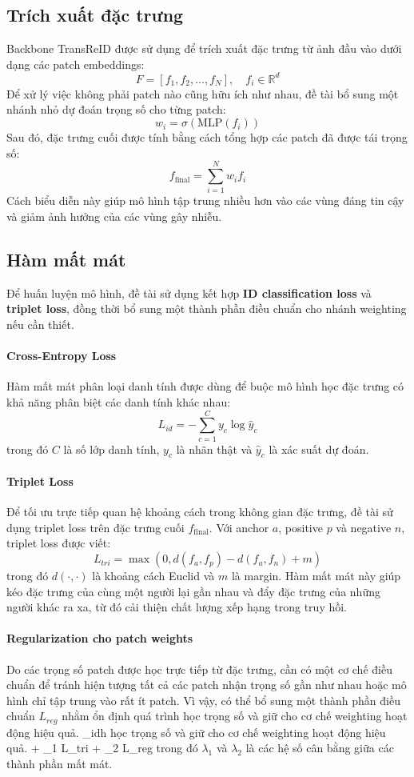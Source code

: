 \subsection{Trích xuất đặc trưng}

Backbone TransReID được sử dụng để trích xuất đặc trưng từ ảnh đầu vào dưới dạng các patch embeddings:
\[
F = [f_1,f_2,\dots,f_N], \quad f_i \in \mathbb{R}^d
\]
Để xử lý việc không phải patch nào cũng hữu ích như nhau, đề tài bổ sung một nhánh nhỏ dự đoán trọng số cho từng patch:
\[
w_i = \sigma(\text{MLP}(f_i))
\]
Sau đó, đặc trưng cuối được tính bằng cách tổng hợp các patch đã được tái trọng số:
\[
f_{\text{final}} = \sum_{i=1}^{N} w_i f_i
\]
Cách biểu diễn này giúp mô hình tập trung nhiều hơn vào các vùng đáng tin cậy và giảm ảnh hưởng của các vùng gây nhiễu.

\subsection{Hàm mất mát}
Để huấn luyện mô hình, đề tài sử dụng kết hợp \textbf{ID classification loss} và \textbf{triplet loss}, đồng thời bổ sung một thành phần điều chuẩn cho nhánh weighting nếu cần thiết.

\paragraph{Cross-Entropy Loss} Hàm mất mát phân loại danh tính được dùng để buộc mô hình học đặc trưng có khả năng phân biệt các danh tính khác nhau:
\[
L_{id} = - \sum_{c=1}^{C} y_c \log \hat{y}_c
\]
trong đó \(C\) là số lớp danh tính, \(y_c\) là nhãn thật và \(\hat{y}_c\) là xác suất dự đoán.

\paragraph{Triplet Loss} Để tối ưu trực tiếp quan hệ khoảng cách trong không gian đặc trưng, đề tài sử dụng triplet loss trên đặc trưng cuối \(f_{\text{final}}\). Với anchor \(a\), positive \(p\) và negative \(n\), triplet loss được viết:
\[
L_{tri} = \max \left(0, d(f_a,f_p) - d(f_a,f_n) + m \right)
\]
trong đó \(d(\cdot,\cdot)\) là khoảng cách Euclid và \(m\) là margin. Hàm mất mát này giúp kéo đặc trưng của cùng một người lại gần nhau và đẩy đặc trưng của những người khác ra xa, từ đó cải thiện chất lượng xếp hạng trong truy hồi.

\paragraph{Regularization cho patch weights} Do các trọng số patch được học trực tiếp từ đặc trưng, cần có một cơ chế điều chuẩn để tránh hiện tượng tất cả các patch nhận trọng số gần như nhau hoặc mô hình chỉ tập trung vào rất ít patch. Vì vậy, có thể bổ sung một thành phần điều chuẩn \(L_{reg}\) nhằm ổn định quá trình học trọng số và giữ cho cơ chế weighting hoạt động hiệu quả.
_{idh học trọng số và giữ cho cơ chế weighting hoạt động hiệu quả.
} + \lambda_1 L_{tri} + \lambda_2 L_{reg}
\]
trong đó \(\lambda_1\) và \(\lambda_2\) là các hệ số cân bằng giữa các thành phần mất mát.

